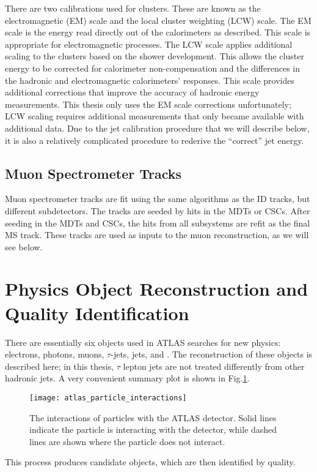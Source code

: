There are two calibrations used for clusters.
These are known as the electromagnetic (EM) scale and the local cluster weighting (LCW) scale.
The EM scale is the energy read directly out of the calorimeters as described.
This scale is appropriate for electromagnetic processes.
The LCW scale applies additional scaling to the clusters based on the shower development.
This allows the cluster energy to be corrected for calorimeter non-compensation and the differences in the hadronic and electromagnetic calorimeters' responses.
This scale provides additional corrections that improve the accuracy of hadronic energy measurements.
This thesis only uses the EM scale corrections unfortunately; LCW scaling requires additional measurements that only became available with additional data.
Due to the jet calibration procedure that we will describe below, it is also a relatively complicated procedure to rederive the ``correct'' jet energy.

\subsection{Muon Spectrometer Tracks}\label{sec:ms_tracks}

Muon spectrometer tracks are fit using the same algorithms as the ID tracks, but different subdetectors.
The tracks are seeded by hits in the MDTs or CSCs.
After seeding in the MDTs and CSCs, the hits from all subsystems are refit as the final MS track.
These tracks are used as inputs to the muon reconstruction, as we will see below.

\section{Physics Object Reconstruction and Quality Identification}

There are essentially six objects used in ATLAS searches for new physics: electrons, photons, muons, $\tau$-jets, jets, and \met.
The reconstruction of these objects is described here; in this thesis, $\tau$ lepton jets are not treated differently from other hadronic jets.
A very convenient summary plot is shown in Fig.\ref{fig:atlas_interactions}.
\begin{figure}
\caption{The interactions of particles with the ATLAS detector.
Solid lines indicate the particle is interacting with the detector, while dashed lines are shown where the particle does not interact.} \label{fig:atlas_interactions}
\texttt{[image: atlas\_particle\_interactions]}
\end{figure}
This process produces candidate objects, which are then identified by quality.

